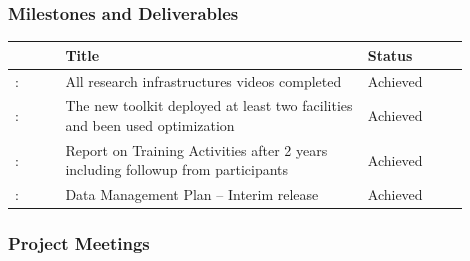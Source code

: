 \subsubsection*{Milestones and Deliverables}

{\fontsize{9}{11}\selectfont
\begin{center}
  \begin{tabular}[t]{!{\color{mygray}\vrule}p{0.10\linewidth}!
  {\color{mygray}\vrule}p{0.60\linewidth}!
  {\color{mygray}\vrule}p{0.20\linewidth}!{\color{mygray}\vrule} } \hline
     & {\bf Title} & {\bf Status} \\ 

    \hline
    : & All research  infrastructures videos completed & Achieved \\
    \hline
    : & The new toolkit deployed at least two facilities and been used optimization  & Achieved \\
    \hline
    : & Report on Training Activities after 2 years including followup from participants & Achieved \\ 
    \hline
    : & Data Management Plan – Interim release  & Achieved \\ 
    \hline
  \end{tabular}
\end{center}
}

\subsubsection*{Project Meetings}


